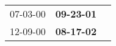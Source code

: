 \begin{supertabular}{p{0.33\columnwidth}p{0.33\columnwidth}p{0.33\columnwidth}}
 07-03-00\textsuperscript{} &  \textbf{09-23-01\textsuperscript{}} \\
 12-09-00\textsuperscript{} &  \textbf{08-17-02\textsuperscript{}} \\
\end{supertabular}
